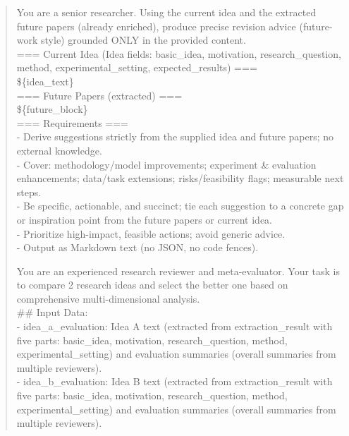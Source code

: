 \begin{quote}
    \begin{tcolorbox}[breakable,colback=report!20!white, colframe=report!60!black, title=\textbf{Prompt for Report Agent (Revision Suggestion)}]
    \label{app:prompt_report_revision}
        You are a senior researcher. Using the current idea and the extracted future papers (already enriched), produce precise revision advice (future-work style) grounded ONLY in the provided content.\\

        === Current Idea (Idea fields: basic\_idea, motivation, research\_question, method, experimental\_setting, expected\_results) ===\\
        \$\{idea\_text\}\\

        === Future Papers (extracted) ===\\
        \$\{future\_block\}\\

        === Requirements ===\\
        - Derive suggestions strictly from the supplied idea and future papers; no external knowledge.\\
        - Cover: methodology/model improvements; experiment \& evaluation enhancements; data/task extensions; risks/feasibility flags; measurable next steps.\\
        - Be specific, actionable, and succinct; tie each suggestion to a concrete gap or inspiration point from the future papers or current idea.\\
        - Prioritize high-impact, feasible actions; avoid generic advice.\\
        - Output as Markdown text (no JSON, no code fences).
    \end{tcolorbox}

    \begin{tcolorbox}[breakable,colback=report!20!white, colframe=report!60!black, title=\textbf{Prompt for Report Agent (Pair Comparison)}]
    \label{app:prompt_pair}
        You are an experienced research reviewer and meta-evaluator. Your task is to compare 2 research ideas and select the better one based on comprehensive multi-dimensional analysis.\\

        \#\# Input Data:\\
        - idea\_a\_evaluation: Idea A text (extracted from extraction\_result with five parts: basic\_idea, motivation, research\_question, method, experimental\_setting) and evaluation summaries (overall summaries from multiple reviewers).\\
        - idea\_b\_evaluation: Idea B text (extracted from extraction\_result with five parts: basic\_idea, motivation, research\_question, method, experimental\_setting) and evaluation summaries (overall summaries from multiple reviewers).\\


\end{tcolorbox}
\end{quote}
